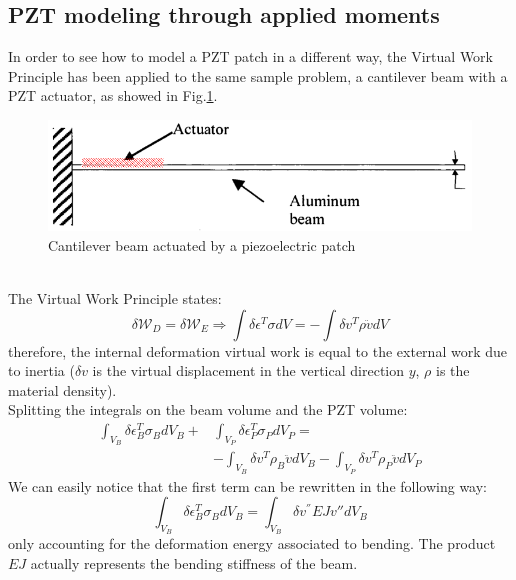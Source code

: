 \documentclass[twocolumn,a4paper,10pt,english]{article}
\begin{document}
    \subsection{PZT modeling through applied moments}
	    In order to see how to model a PZT patch in a different way, the Virtual Work Principle has been applied to the same sample problem, a cantilever beam with a PZT actuator, as showed in Fig.\ref{fig:vwp}.\\
	    \begin{figure}[htp]
	    	\centering
	    	\includegraphics[width=0.6\linewidth]{images/vwp.jpg}
	    	\caption{Cantilever beam actuated by a piezoelectric patch}
	    	\label{fig:vwp}
	    \end{figure}\\
	    The Virtual Work Principle states:
	    \begin{equation}
	    \delta\mathcal{W}_D=\delta\mathcal{W}_E \Longrightarrow \int\delta\epsilon^T\sigma dV=-\int\delta v^T \rho\ddot{v}dV
	    \end{equation}
	    therefore, the internal deformation virtual work is equal to the external work due to inertia ($\delta v$ is the virtual displacement in the vertical direction $y$, $\rho$ is the material density).\\
	    Splitting the integrals on the beam volume and the PZT volume:
	    \begin{equation}\begin{split}
	    \int_{V_B}\delta\epsilon_B^T\sigma_B dV_B+&\int_{V_P}\delta\epsilon_P^T\sigma_P dV_P=\\
	    &-\int_{V_B}\delta v^T \rho_B\ddot{v}dV_B-\int_{V_P}\delta v^T \rho_P\ddot{v}dV_P
	    \label{virtual_developed}
	    \end{split}\end{equation}
	    We can easily notice that the first term can be rewritten in the following way:
	    \begin{equation}
	    	\int_{V_B}\delta\epsilon_B^T\sigma_B dV_B=\int_{V_B}\delta v^{''}EJv{''}dV_B
	    \end{equation}
	    only accounting for the deformation energy associated to bending. The product $EJ$ actually represents the bending stiffness of the beam.\\
\end{document}
